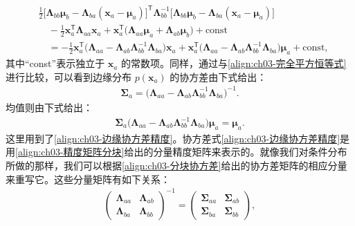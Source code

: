 \documentclass[../../main.tex]{subfiles}
\begin{document}
\begin{align}
&\frac{1}{2}\bigl[\boldsymbol{\Lambda}_{bb}\boldsymbol{\mu}_{b}-\boldsymbol{\Lambda}_{ba}(\boldsymbol{x}_{a}-\boldsymbol{\mu}_{a})\bigr]^{\mathsf{T}}\boldsymbol{\Lambda}_{bb}^{-1}\bigl[\boldsymbol{\Lambda}_{bb}\boldsymbol{\mu}_{b}-\boldsymbol{\Lambda}_{ba}(\boldsymbol{x}_{a}-\boldsymbol{\mu}_{a})\bigr]\nonumber\\
&\quad-\frac{1}{2}\boldsymbol{x}_{a}^{\mathsf{T}}\boldsymbol{\Lambda}_{aa}\boldsymbol{x}_{a}+\boldsymbol{x}_{a}^{\mathsf{T}}\bigl(\boldsymbol{\Lambda}_{aa}\boldsymbol{\mu}_{a}+\boldsymbol{\Lambda}_{ab}\boldsymbol{\mu}_{b}\bigr)+\text{const}\nonumber\\
&\quad=-\frac{1}{2}\boldsymbol{x}_{a}^{\mathsf{T}}\bigl(\boldsymbol{\Lambda}_{aa}-\boldsymbol{\Lambda}_{ab}\boldsymbol{\Lambda}_{bb}^{-1}\boldsymbol{\Lambda}_{ba}\bigr)\boldsymbol{x}_{a}+\boldsymbol{x}_{a}^{\mathsf{T}}\bigl(\boldsymbol{\Lambda}_{aa}-\boldsymbol{\Lambda}_{ab}\boldsymbol{\Lambda}_{bb}^{-1}\boldsymbol{\Lambda}_{ba}\bigr)\boldsymbol{\mu}_{a}+\text{const},
\label{align:ch03-边缘二次型}
\end{align}
其中“const”表示独立于 $\boldsymbol{x}_{a}$ 的常数项。同样，通过与\eqref{align:ch03-完全平方恒等式}进行比较，可以看到边缘分布 $p(\boldsymbol{x}_{a})$ 的协方差由下式给出：
\begin{align}
\boldsymbol{\Sigma}_{a}=\bigl(\boldsymbol{\Lambda}_{aa}-\boldsymbol{\Lambda}_{ab}\boldsymbol{\Lambda}_{bb}^{-1}\boldsymbol{\Lambda}_{ba}\bigr)^{-1}.
\label{align:ch03-边缘协方差精度}
\end{align}
均值则由下式给出：
\begin{align}
\boldsymbol{\Sigma}_{a}\bigl(\boldsymbol{\Lambda}_{aa}-\boldsymbol{\Lambda}_{ab}\boldsymbol{\Lambda}_{bb}^{-1}\boldsymbol{\Lambda}_{ba}\bigr)\boldsymbol{\mu}_{a}=\boldsymbol{\mu}_{a}.
\label{align:ch03-边缘均值精度}
\end{align}
这里用到了\eqref{align:ch03-边缘协方差精度}。协方差式\eqref{align:ch03-边缘协方差精度}是用\eqref{align:ch03-精度矩阵分块}给出的分量精度矩阵来表示的。就像我们对条件分布所做的那样，我们可以根据\eqref{align:ch03-分块协方差}给出的协方差矩阵的相应分量来重写它。这些分量矩阵有如下关系：
\begin{align}
\begin{pmatrix}\boldsymbol{\Lambda}_{aa} & \boldsymbol{\Lambda}_{ab}\\ \boldsymbol{\Lambda}_{ba} & \boldsymbol{\Lambda}_{bb}\end{pmatrix}^{-1}=\begin{pmatrix}\boldsymbol{\Sigma}_{aa} & \boldsymbol{\Sigma}_{ab}\\ \boldsymbol{\Sigma}_{ba} & \boldsymbol{\Sigma}_{bb}\end{pmatrix},
\label{align:ch03-边缘分块逆}
\end{align}
\end{document}
